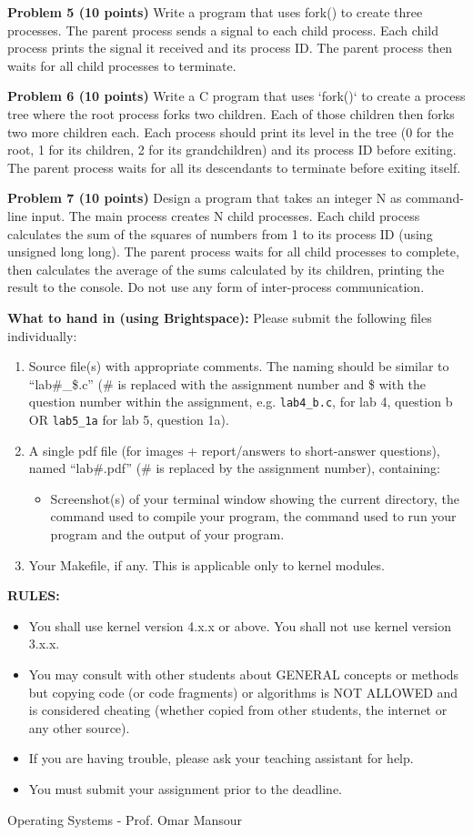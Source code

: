 \documentclass{article}
\begin{document}
\textbf{Problem 5 (10 points)} Write a program that uses fork() to create three processes. The parent process sends a signal to each child process. Each child process prints the signal it received and its process ID. The parent process then waits for all child processes to terminate.


\textbf{Problem 6 (10 points)}  Write a C program that uses `fork()` to create a process tree where the root process forks two children. Each of those children then forks two more children each.  Each process should print its level in the tree (0 for the root, 1 for its children, 2 for its grandchildren) and its process ID before exiting.  The parent process waits for all its descendants to terminate before exiting itself.


\textbf{Problem 7 (10 points)}  Design a program that takes an integer N as command-line input. The main process creates N child processes. Each child process calculates the sum of the squares of numbers from 1 to its process ID (using unsigned long long). The parent process waits for all child processes to complete, then calculates the average of the sums calculated by its children, printing the result to the console.   Do not use any form of inter-process communication.


\textbf{What to hand in (using Brightspace): }
Please submit the following files individually:
\begin{enumerate}
    \item Source file(s) with appropriate comments. The naming should be similar to “lab\#\_\$.c” (\# is replaced with the assignment number and \$ with the question number within the assignment, e.g. \texttt{lab4\_b.c}, for lab 4, question b OR \texttt{lab5\_1a} for lab 5, question 1a).
    \item A single pdf file (for images + report/answers to short-answer questions), named “lab\#.pdf” (\# is replaced by the assignment number), containing:
    \begin{itemize}
        \item Screenshot(s) of your terminal window showing the current directory, the command used to compile your program, the command used to run your program and the output of your program.
    \end{itemize}
    \item Your Makefile, if any. This is applicable only to kernel modules.
\end{enumerate}

\textbf{RULES:}
\begin{itemize}
    \item You shall use kernel version 4.x.x or above. You shall not use kernel version 3.x.x.
    \item You may consult with other students about GENERAL concepts or methods but copying code (or code fragments) or algorithms is NOT ALLOWED and is considered cheating (whether copied from other students, the internet or any other source).
    \item If you are having trouble, please ask your teaching assistant for help.
    \item You must submit your assignment prior to the deadline.
\end{itemize}
Operating Systems - Prof. Omar Mansour
\end{document}
